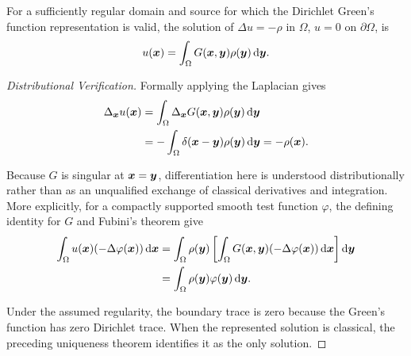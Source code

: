\begin{theorem}
For a sufficiently regular domain and source for which the Dirichlet Green's function representation is valid, the solution of $\Delta u=-\rho$ in $\Omega$, $u=0$ on $\partial\Omega$, is
\begin{equation}
u(\bm{x})=\int_\Omega G(\bm{x},\bm{y})\rho(\bm{y})\,\mathrm{d}\bm{y}.
\end{equation}

\end{theorem}

\begin{proof}[Distributional Verification]
Formally applying the Laplacian gives
\begin{align}
\Delta_{\bm{x}}u(\bm{x})
&=\int_\Omega\Delta_{\bm{x}}G(\bm{x},\bm{y})\rho(\bm{y})\,\mathrm{d}\bm{y}\notag\\
&=-\int_\Omega\delta(\bm{x}-\bm{y})\rho(\bm{y})\,\mathrm{d}\bm{y}=-\rho(\bm{x}).
\end{align}

Because $G$ is singular at $\bm{x}=\bm{y}$, differentiation here is understood distributionally rather than as an unqualified exchange of classical derivatives and integration. More explicitly, for a compactly supported smooth test function $\varphi$, the defining identity for $G$ and Fubini's theorem give
\begin{align}
\int_\Omega u(\bm{x})(-\Delta\varphi(\bm{x}))\,\mathrm{d}\bm{x}
&=\int_\Omega\rho(\bm{y})\left[\int_\Omega G(\bm{x},\bm{y})(-\Delta\varphi(\bm{x}))\,\mathrm{d}\bm{x}\right]\mathrm{d}\bm{y}\notag\\
&=\int_\Omega\rho(\bm{y})\varphi(\bm{y})\,\mathrm{d}\bm{y}.
\end{align}

Under the assumed regularity, the boundary trace is zero because the Green's function has zero Dirichlet trace. When the represented solution is classical, the preceding uniqueness theorem identifies it as the only solution.
\end{proof}

